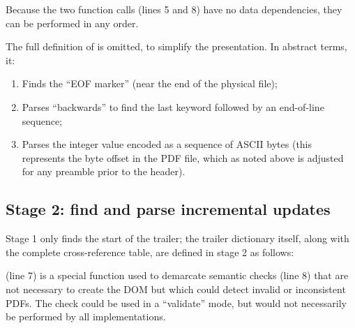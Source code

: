 Because the two function calls (lines 5 and 8) have no data
dependencies, they can be performed in any order.
%

The full definition of  is
omitted, to simplify the presentation.
%
In abstract terms, it:
\begin{enumerate}
\item Finds the ``EOF marker''  (near the end of the physical
  file);
\item Parses ``backwards'' to find the last  keyword
  followed by an end-of-line sequence;
\item Parses the integer value encoded as a sequence of ASCII bytes
  (this represents the byte offset in the PDF file, which as noted
  above is adjusted for any preamble prior to the header).
\end{enumerate}

\subsection{Stage 2: find and parse incremental updates}
\label{sec:stage-2}
%
Stage 1 only finds the start of the trailer;
%
the trailer dictionary itself, along with the complete cross-reference table, are defined in stage 2 as follows:
%
\lstset{numbers=right}
\lstset{numbers=none}

 (line 7) is a special function used to demarcate semantic checks (line 8) that are not necessary to
create the DOM but which could detect invalid or inconsistent PDFs.
%
The check could be used in a ``validate'' mode, but would not necessarily be performed by all implementations.

